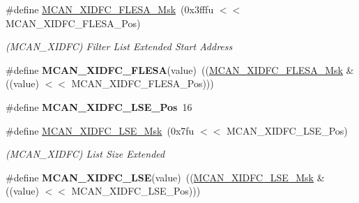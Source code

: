 \begin{DoxyCompactItemize}
\item 
\mbox{\label{group__SAMV71__MCAN_ga7b250cd29a90d410d512fc8f4c687575}} 
\#define \mbox{\hyperlink{group__SAMV71__MCAN_ga7b250cd29a90d410d512fc8f4c687575}{M\+C\+A\+N\+\_\+\+X\+I\+D\+F\+C\+\_\+\+F\+L\+E\+S\+A\+\_\+\+Msk}}~(0x3fffu $<$$<$ M\+C\+A\+N\+\_\+\+X\+I\+D\+F\+C\+\_\+\+F\+L\+E\+S\+A\+\_\+\+Pos)
\begin{DoxyCompactList}\small\item\em (M\+C\+A\+N\+\_\+\+X\+I\+D\+FC) Filter List Extended Start Address \end{DoxyCompactList}\item 
\mbox{\label{group__SAMV71__MCAN_ga7599f8541a899056f1247c196356b8c2}} 
\#define {\bfseries M\+C\+A\+N\+\_\+\+X\+I\+D\+F\+C\+\_\+\+F\+L\+E\+SA}(value)~((\mbox{\hyperlink{group__SAMV71__MCAN_ga7b250cd29a90d410d512fc8f4c687575}{M\+C\+A\+N\+\_\+\+X\+I\+D\+F\+C\+\_\+\+F\+L\+E\+S\+A\+\_\+\+Msk}} \& ((value) $<$$<$ M\+C\+A\+N\+\_\+\+X\+I\+D\+F\+C\+\_\+\+F\+L\+E\+S\+A\+\_\+\+Pos)))
\item 
\mbox{\label{group__SAMV71__MCAN_ga6e01ed3f23d55f9ffb45296043289f0d}} 
\#define {\bfseries M\+C\+A\+N\+\_\+\+X\+I\+D\+F\+C\+\_\+\+L\+S\+E\+\_\+\+Pos}~16
\item 
\mbox{\label{group__SAMV71__MCAN_gae97ae0b9da3a0dd490be81db3eece809}} 
\#define \mbox{\hyperlink{group__SAMV71__MCAN_gae97ae0b9da3a0dd490be81db3eece809}{M\+C\+A\+N\+\_\+\+X\+I\+D\+F\+C\+\_\+\+L\+S\+E\+\_\+\+Msk}}~(0x7fu $<$$<$ M\+C\+A\+N\+\_\+\+X\+I\+D\+F\+C\+\_\+\+L\+S\+E\+\_\+\+Pos)
\begin{DoxyCompactList}\small\item\em (M\+C\+A\+N\+\_\+\+X\+I\+D\+FC) List Size Extended \end{DoxyCompactList}\item 
\mbox{\label{group__SAMV71__MCAN_ga6828b9bb807fed9aa3f8a9549db6e3b9}} 
\#define {\bfseries M\+C\+A\+N\+\_\+\+X\+I\+D\+F\+C\+\_\+\+L\+SE}(value)~((\mbox{\hyperlink{group__SAMV71__MCAN_gae97ae0b9da3a0dd490be81db3eece809}{M\+C\+A\+N\+\_\+\+X\+I\+D\+F\+C\+\_\+\+L\+S\+E\+\_\+\+Msk}} \& ((value) $<$$<$ M\+C\+A\+N\+\_\+\+X\+I\+D\+F\+C\+\_\+\+L\+S\+E\+\_\+\+Pos)))
\item 
\mbox{\label{group__SAMV71__MCAN_ga7561b9f2f00a8475332b6c6b7294680c}} 

\end{DoxyCompactItemize}
